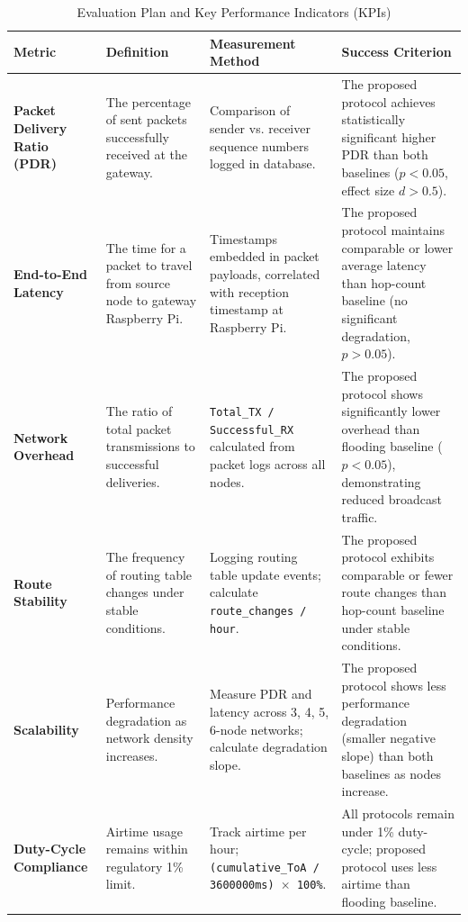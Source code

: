 \begin{table}[H]
\centering
\caption{Evaluation Plan and Key Performance Indicators (KPIs)}
\label{tab:evaluation-metrics}
\begin{tabular}{p{3cm}p{3cm}p{4cm}p{4cm}}
\hline
\textbf{Metric} & \textbf{Definition} & \textbf{Measurement Method} & \textbf{Success Criterion} \\
\hline
\textbf{Packet Delivery Ratio (PDR)} & The percentage of sent packets successfully received at the gateway. & Comparison of sender vs. receiver sequence numbers logged in database. & The proposed protocol achieves statistically significant higher PDR than both baselines ($p < 0.05$, effect size $d > 0.5$). \\
\hline
\textbf{End-to-End Latency} & The time for a packet to travel from source node to gateway Raspberry Pi. & Timestamps embedded in packet payloads, correlated with reception timestamp at Raspberry Pi. & The proposed protocol maintains comparable or lower average latency than hop-count baseline (no significant degradation, $p > 0.05$). \\
\hline
\textbf{Network Overhead} & The ratio of total packet transmissions to successful deliveries. & \texttt{Total\_TX / Successful\_RX} calculated from packet logs across all nodes. & The proposed protocol shows significantly lower overhead than flooding baseline ($p < 0.05$), demonstrating reduced broadcast traffic. \\
\hline
\textbf{Route Stability} & The frequency of routing table changes under stable conditions. & Logging routing table update events; calculate \texttt{route\_changes / hour}. & The proposed protocol exhibits comparable or fewer route changes than hop-count baseline under stable conditions. \\
\hline
\textbf{Scalability} & Performance degradation as network density increases. & Measure PDR and latency across 3, 4, 5, 6-node networks; calculate degradation slope. & The proposed protocol shows less performance degradation (smaller negative slope) than both baselines as nodes increase. \\
\hline
\textbf{Duty-Cycle Compliance} & Airtime usage remains within regulatory 1\% limit. & Track airtime per hour; \texttt{(cumulative\_ToA / 3600000ms) $\times$ 100\%}. & All protocols remain under 1\% duty-cycle; proposed protocol uses less airtime than flooding baseline. \\
\hline
\end{tabular}
\end{table}

